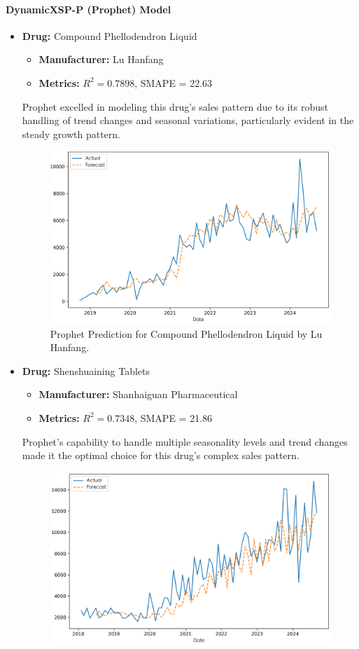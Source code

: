 \documentclass[journal]{IEEEtran}
\begin{document}
\paragraph{DynamicXSP-P (Prophet) Model}
\begin{itemize}
\item \textbf{Drug:} Compound Phellodendron Liquid
\begin{itemize}
\item \textbf{Manufacturer:} Lu Hanfang
\item \textbf{Metrics:} $R^2 = 0.7898$, SMAPE = 22.63
\end{itemize}
Prophet excelled in modeling this drug's sales pattern due to its robust handling of trend changes and seasonal variations, particularly evident in the steady growth pattern.
\begin{figure}[H]
\centering
\includegraphics[width=\linewidth]{../Result_Paper/Prophet_Prediction_复方黄柏液涂剂_鲁汉方.png}
\caption{Prophet Prediction for Compound Phellodendron Liquid by Lu Hanfang.}
\label{fig:phellodendron}
\end{figure}
\item \textbf{Drug:} Shenshuaining Tablets
\begin{itemize}
\item \textbf{Manufacturer:} Shanhaiguan Pharmaceutical
\item \textbf{Metrics:} $R^2 = 0.7348$, SMAPE = 21.86
\end{itemize}
Prophet's capability to handle multiple seasonality levels and trend changes made it the optimal choice for this drug's complex sales pattern.
\begin{figure}[H]
\centering
\includegraphics[width=\linewidth]{../Result_Paper/Prophet_Prediction_肾衰宁片_山海关药业.png}

\end{figure}
\end{itemize}
\end{document}
